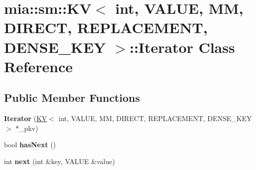 \hypertarget{classmia_1_1sm_1_1_k_v_3_01int_00_01_v_a_l_u_e_00_01_m_m_00_01_d_i_r_e_c_t_00_01_r_e_p_l_a_c_e_m00136a9f08c6f99ce3723959776b6b87}{\section{mia\-:\-:sm\-:\-:K\-V$<$ int, V\-A\-L\-U\-E, M\-M, D\-I\-R\-E\-C\-T, R\-E\-P\-L\-A\-C\-E\-M\-E\-N\-T, D\-E\-N\-S\-E\-\_\-\-K\-E\-Y $>$\-:\-:Iterator Class Reference}
\label{classmia_1_1sm_1_1_k_v_3_01int_00_01_v_a_l_u_e_00_01_m_m_00_01_d_i_r_e_c_t_00_01_r_e_p_l_a_c_e_m00136a9f08c6f99ce3723959776b6b87}
}
\subsection*{Public Member Functions}
\begin{DoxyCompactItemize}
\item 
\hypertarget{classmia_1_1sm_1_1_k_v_3_01int_00_01_v_a_l_u_e_00_01_m_m_00_01_d_i_r_e_c_t_00_01_r_e_p_l_a_c_e_m00136a9f08c6f99ce3723959776b6b87_ac149131331de14e47ca5fff40ba6d2d3}{{\bfseries Iterator} (\hyperlink{classmia_1_1sm_1_1_k_v}{K\-V}$<$ int, V\-A\-L\-U\-E, M\-M, D\-I\-R\-E\-C\-T, R\-E\-P\-L\-A\-C\-E\-M\-E\-N\-T, D\-E\-N\-S\-E\-\_\-\-K\-E\-Y $>$ $\ast$\-\_\-pkv)}\label{classmia_1_1sm_1_1_k_v_3_01int_00_01_v_a_l_u_e_00_01_m_m_00_01_d_i_r_e_c_t_00_01_r_e_p_l_a_c_e_m00136a9f08c6f99ce3723959776b6b87_ac149131331de14e47ca5fff40ba6d2d3}

\item 
\hypertarget{classmia_1_1sm_1_1_k_v_3_01int_00_01_v_a_l_u_e_00_01_m_m_00_01_d_i_r_e_c_t_00_01_r_e_p_l_a_c_e_m00136a9f08c6f99ce3723959776b6b87_a5e151288dc517a104675164bab49485a}{bool {\bfseries has\-Next} ()}\label{classmia_1_1sm_1_1_k_v_3_01int_00_01_v_a_l_u_e_00_01_m_m_00_01_d_i_r_e_c_t_00_01_r_e_p_l_a_c_e_m00136a9f08c6f99ce3723959776b6b87_a5e151288dc517a104675164bab49485a}

\item 
\hypertarget{classmia_1_1sm_1_1_k_v_3_01int_00_01_v_a_l_u_e_00_01_m_m_00_01_d_i_r_e_c_t_00_01_r_e_p_l_a_c_e_m00136a9f08c6f99ce3723959776b6b87_af91077c2355b5a889410ad1b19d74af0}{int {\bfseries next} (int \&key, V\-A\-L\-U\-E \&value)}\label{classmia_1_1sm_1_1_k_v_3_01int_00_01_v_a_l_u_e_00_01_m_m_00_01_d_i_r_e_c_t_00_01_r_e_p_l_a_c_e_m00136a9f08c6f99ce3723959776b6b87_af91077c2355b5a889410ad1b19d74af0}

\end{DoxyCompactItemize}
